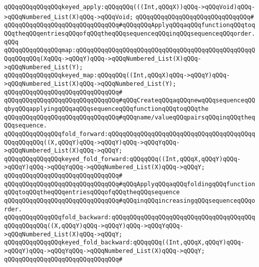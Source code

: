 \verb|qQQqqQQqqQQqqQQqkeyed_apply:qQQqqQQq(((Int,qQQqX))qQQq->qQQqVoid)qQQq->qQQqNumbered_List(X)qQQq->qQQqVoid;|\newline
\verb|qQQqqQQqqQQqqQQqqQQqqQQqqQQqqQQq#|\newline
\verb|qQQqqQQqqQQqqQQqqQQqqQQqqQQqqQQq#qQQqqQQqApplyqQQqaqQQqfunctionqQQqtoqQQqtheqQQqentriesqQQqofqQQqtheqQQqsequenceqQQqinqQQqsequenceqQQqorder.qQQq|\newline
\newline
\verb|qQQqqQQqqQQqqQQqmap:qQQqqQQqqQQqqQQqqQQqqQQqqQQqqQQqqQQqqQQqqQQqqQQqqQQqqQQqqQQq(XqQQq->qQQqY)qQQq->qQQqNumbered_List(X)qQQq->qQQqNumbered_List(Y);|\newline
\verb|qQQqqQQqqQQqqQQqkeyed_map:qQQqqQQq((Int,qQQqX)qQQq->qQQqY)qQQq->qQQqNumbered_List(X)qQQq->qQQqNumbered_List(Y);|\newline
\verb|qQQqqQQqqQQqqQQqqQQqqQQqqQQqqQQq#|\newline
\verb|qQQqqQQqqQQqqQQqqQQqqQQqqQQqqQQq#qQQqCreateqQQqaqQQqnewqQQqsequenceqQQqbyqQQqapplyingqQQqaqQQqsequenceqQQqfunctionqQQqtoqQQqthe|\newline
\verb|qQQqqQQqqQQqqQQqqQQqqQQqqQQqqQQq#qQQqname/valueqQQqpairsqQQqinqQQqtheqQQqsequence.|\newline
\newline
\verb|qQQqqQQqqQQqqQQqfold_forward:qQQqqQQqqQQqqQQqqQQqqQQqqQQqqQQqqQQqqQQqqQQqqQQqqQQq((X,qQQqY)qQQq->qQQqY)qQQq->qQQqYqQQq->qQQqNumbered_List(X)qQQq->qQQqY;|\newline
\verb|qQQqqQQqqQQqqQQqkeyed_fold_forward:qQQqqQQq((Int,qQQqX,qQQqY)qQQq->qQQqY)qQQq->qQQqYqQQq->qQQqNumbered_List(X)qQQq->qQQqY;|\newline
\verb|qQQqqQQqqQQqqQQqqQQqqQQqqQQqqQQq#|\newline
\verb|qQQqqQQqqQQqqQQqqQQqqQQqqQQqqQQq#qQQqApplyqQQqaqQQqfoldingqQQqfunctionqQQqtoqQQqtheqQQqentriesqQQqofqQQqtheqQQqsequence|\newline
\verb|qQQqqQQqqQQqqQQqqQQqqQQqqQQqqQQq#qQQqinqQQqincreasingqQQqsequenceqQQqorder.|\newline
\newline
\verb|qQQqqQQqqQQqqQQqfold_backward:qQQqqQQqqQQqqQQqqQQqqQQqqQQqqQQqqQQqqQQqqQQqqQQqqQQq((X,qQQqY)qQQq->qQQqY)qQQq->qQQqYqQQq->qQQqNumbered_List(X)qQQq->qQQqY;|\newline
\verb|qQQqqQQqqQQqqQQqkeyed_fold_backward:qQQqqQQq((Int,qQQqX,qQQqY)qQQq->qQQqY)qQQq->qQQqYqQQq->qQQqNumbered_List(X)qQQq->qQQqY;|\newline
\verb|qQQqqQQqqQQqqQQqqQQqqQQqqQQqqQQq#|\newline
